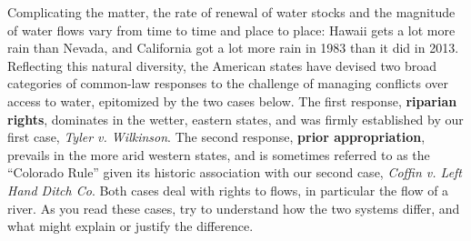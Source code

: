Complicating the matter, the rate of renewal of water stocks and the magnitude
of water flows vary from time to time and place to place: Hawaii gets a lot more
rain than Nevada, and California got a lot more rain in 1983 than it did in
2013. Reflecting this natural diversity, the American states have devised two
broad categories of common-law responses to the challenge of managing conflicts
over access to water, epitomized by the two cases below. The first response,
\textbf{riparian rights}, dominates in the wetter, eastern states, and was
firmly established by our first case, \textit{Tyler v. Wilkinson}. The second
response, \textbf{prior appropriation}, prevails in the more arid western
states, and is sometimes referred to as the ``Colorado Rule'' given its historic
association with our second case, \textit{Coffin v. Left Hand Ditch Co}. Both
cases deal with rights to flows, in particular the flow of a river. As you read
these cases, try to understand how the two systems differ, and what might
explain or justify the difference.

